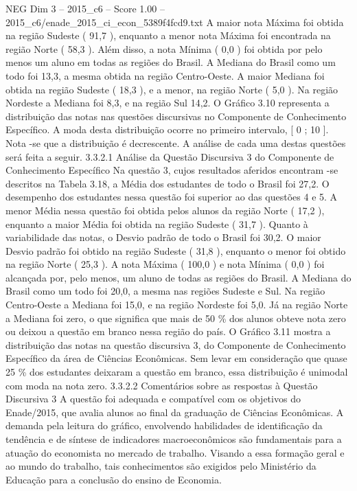 \begin{textsample}{NEG Dim 3 – 2015\_c6 – Score 1.00 – 2015\_c6/enade\_2015\_ci\_econ\_5389f4fcd9.txt}
A maior nota Máxima foi obtida na região Sudeste ( 91,7 ), enquanto a menor nota Máxima foi encontrada na região Norte ( 58,3 ).
Além disso, a nota Mínima ( 0,0 ) foi obtida por pelo menos um aluno em todas as regiões do Brasil.
A Mediana do Brasil como um todo foi 13,3, a mesma obtida na região Centro-Oeste.
A maior Mediana foi obtida na região Sudeste ( 18,3 ), e a menor, na região Norte ( 5,0 ).
Na região Nordeste a Mediana foi 8,3, e na região Sul 14,2.
O Gráfico 3.10 representa a distribuição das notas nas questões discursivas no Componente de Conhecimento Específico.
A moda desta distribuição ocorre no primeiro intervalo, [ 0 ; 10 ].
Nota -se que a distribuição é decrescente.
A análise de cada uma destas questões será feita a seguir. 3.3.2.1 Análise da Questão Discursiva 3 do Componente de Conhecimento Específico Na questão 3, cujos resultados aferidos encontram -se descritos na Tabela 3.18, a Média dos estudantes de todo o Brasil foi 27,2.
O desempenho dos estudantes nessa questão foi superior ao das questões 4 e 5.
A menor Média nessa questão foi obtida pelos alunos da região Norte ( 17,2 ), enquanto a maior Média foi obtida na região Sudeste ( 31,7 ).
Quanto à variabilidade das notas, o Desvio padrão de todo o Brasil foi 30,2.
O maior Desvio padrão foi obtido na região Sudeste ( 31,8 ), enquanto o menor foi obtido na região Norte ( 25,3 ).
A nota Máxima ( 100,0 ) e nota Mínima ( 0,0 ) foi alcançada por, pelo menos, um aluno de todas as regiões do Brasil.
A Mediana do Brasil como um todo foi 20,0, a mesma nas regiões Sudeste e Sul.
Na região Centro-Oeste a Mediana foi 15,0, e na região Nordeste foi 5,0.
Já na região Norte a Mediana foi zero, o que significa que mais de 50 \% dos alunos obteve nota zero ou deixou a questão em branco nessa região do país.
O Gráfico 3.11 mostra a distribuição das notas na questão discursiva 3, do Componente de Conhecimento Específico da área de Ciências Econômicas.
Sem levar em consideração que quase 25 \% dos estudantes deixaram a questão em branco, essa distribuição é unimodal com moda na nota zero. 3.3.2.2 Comentários sobre as respostas à Questão Discursiva 3 A questão foi adequada e compatível com os objetivos do Enade/2015, que avalia alunos ao final da graduação de Ciências Econômicas.
A demanda pela leitura do gráfico, envolvendo habilidades de identificação da tendência e de síntese de indicadores macroeconômicos são fundamentais para a atuação do economista no mercado de trabalho.
Visando a essa formação geral e ao mundo do trabalho, tais conhecimentos são exigidos pelo Ministério da Educação para a conclusão do ensino de Economia.

\end{textsample}
